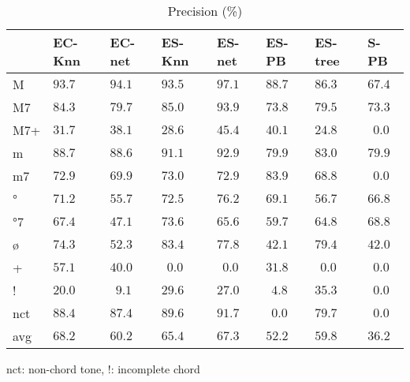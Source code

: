 \documentclass{article}
\begin{document}
\begin{table}
  \centering
  \begin{tabular}{l|p{.5cm}p{.5cm}p{.5cm}p{.5cm}p{.5cm}p{.5cm}p{.5cm}}
   & EC-Knn&EC-net &ES-Knn &ES-net &ES-PB  &ES-tree&S-PB     \\
\hline                                             
M  &$93.7 $&$ 94.1$&$ 93.5$&$ \mathbf{97.1}$&$ 88.7$&$ 86.3$&$ 67.4$  \\
M7 &$84.3 $&$ 79.7$&$ 85.0$&$ \mathbf{93.9}$&$ 73.8$&$ 79.5$&$ 73.3$  \\
M7+&$31.7 $&$ 38.1$&$ 28.6$&$ \mathbf{45.4}$&$ 40.1$&$ 24.8$&$~~0.0$  \\
m  &$88.7 $&$ 88.6$&$ 91.1$&$ \mathbf{92.9}$&$ 79.9$&$ 83.0$&$ 79.9$  \\
m7 &$72.9 $&$ 69.9$&$ 73.0$&$ 72.9$&$ \mathbf{83.9}$&$ 68.8$&$~~0.0$  \\
°  &$71.2 $&$ 55.7$&$ 72.5$&$ \mathbf{76.2}$&$ 69.1$&$ 56.7$&$ 66.8$  \\
°7 &$67.4 $&$ 47.1$&$ \mathbf{73.6}$&$ 65.6$&$ 59.7$&$ 64.8$&$ 68.8$  \\
ø  &$74.3 $&$ 52.3$&$ \mathbf{83.4}$&$ 77.8$&$ 42.1$&$ 79.4$&$ 42.0$  \\
+  &$57.1 $&$ 40.0$&$~~0.0$&$~~0.0$&$ 31.8$&$~~0.0$&$~~0.0$  \\
!  &$20.0 $&$~~9.1$&$ 29.6$&$ 27.0$&$~~4.8$&$ \mathbf{35.3}$&$~~0.0$  \\
nct&$88.4 $&$ 87.4$&$ 89.6$&$ \mathbf{91.7}$&$~~0.0$&$ 79.7$&$~~0.0$  \\
avg&$\mathbf{68.2} $&$ 60.2$&$ 65.4$&$ 67.3$&$ 52.2$&$ 59.8$&$ 36.2$  \\

  \end{tabular}

\medskip

nct: non-chord tone, !: incomplete chord

  \caption{Precision (\%)}
  \label{tab:precision}
\end{table}
\end{document}
